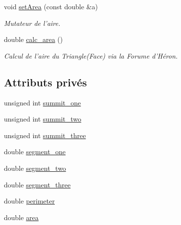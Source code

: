 \begin{DoxyCompactItemize}
void \hyperlink{class_face_a6ee83e39c97a515c49f076d55a14b8bd}{set\-Area} (const double \&a)
\begin{DoxyCompactList}\small\item\em Mutateur de l'aire. \end{DoxyCompactList}\item 
double \hyperlink{class_face_a837adad0761996482010bfc7f5c1403a}{calc\-\_\-area} ()
\begin{DoxyCompactList}\small\item\em Calcul de l'aire du Triangle(\-Face) via la Forume d'Héron. \end{DoxyCompactList}\end{DoxyCompactItemize}
\subsection*{Attributs privés}
\begin{DoxyCompactItemize}
\item 
unsigned int \hyperlink{class_face_a68ff25f391cfe3ee5ce2b7f13dac64fa}{summit\-\_\-one}
\item 
unsigned int \hyperlink{class_face_a8d0b2a96bd53dcf7767c2cefe1fcc1f3}{summit\-\_\-two}
\item 
unsigned int \hyperlink{class_face_af322077aea999dd19dd169bd5bdd4bdf}{summit\-\_\-three}
\item 
double \hyperlink{class_face_ae4053947c53549d2fd5cf43aa9c712f4}{segment\-\_\-one}
\item 
double \hyperlink{class_face_ae79107e53090d0a7efb5070ea093a70e}{segment\-\_\-two}
\item 
double \hyperlink{class_face_a777ca579978d8d20c6e8a5e64a6999cc}{segment\-\_\-three}
\item 
double \hyperlink{class_face_a9b759ee3c90c67bc7af3969546f568f9}{perimeter}
\item 
double \hyperlink{class_face_ae63fcd017fcd355e212a2510209db17c}{area}
\end{DoxyCompactItemize}


